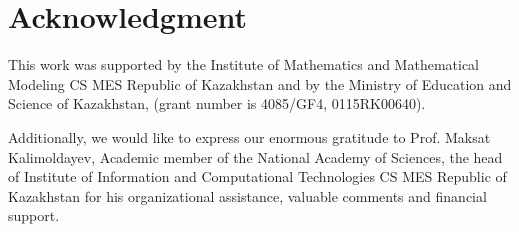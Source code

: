 \documentclass[12pt]{article}
\begin{document}
\section*{Acknowledgment}
This work was supported by the Institute of Mathematics and Mathematical Modeling CS MES Republic of Kazakhstan and by the Ministry of Education and Science of Kazakhstan, (grant number is 4085/GF4, 0115RK00640). 

Additionally, we would like to express our enormous gratitude to Prof. Maksat Kalimoldayev, 
Academic member of the National Academy of Sciences, the head of Institute of Information and Computational Technologies CS MES Republic of Kazakhstan 
for his organizational assistance, valuable comments and financial support.

%

\end{document}
